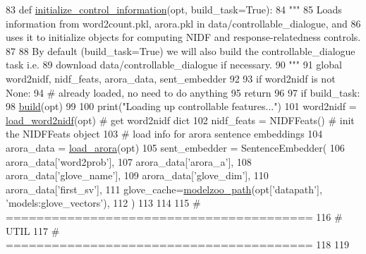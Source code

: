 \begin{DoxyCode}
83 \textcolor{keyword}{def }\hyperlink{namespaceprojects_1_1controllable__dialogue_1_1controllable__seq2seq_1_1controls_aafbe257df1791349439cc63c99de8b5e}{initialize\_control\_information}(opt, build\_task=True):
84     \textcolor{stringliteral}{"""}
85 \textcolor{stringliteral}{    Loads information from word2count.pkl, arora.pkl in data/controllable\_dialogue, and}
86 \textcolor{stringliteral}{    uses it to initialize objects for computing NIDF and response-relatedness controls.}
87 \textcolor{stringliteral}{}
88 \textcolor{stringliteral}{    By default (build\_task=True) we will also build the controllable\_dialogue task i.e.}
89 \textcolor{stringliteral}{    download data/controllable\_dialogue if necessary.}
90 \textcolor{stringliteral}{    """}
91     \textcolor{keyword}{global} word2nidf, nidf\_feats, arora\_data, sent\_embedder
92 
93     \textcolor{keywordflow}{if} word2nidf \textcolor{keywordflow}{is} \textcolor{keywordflow}{not} \textcolor{keywordtype}{None}:
94         \textcolor{comment}{# already loaded, no need to do anything}
95         \textcolor{keywordflow}{return}
96 
97     \textcolor{keywordflow}{if} build\_task:
98         \hyperlink{namespaceparlai_1_1mturk_1_1tasks_1_1talkthewalk_1_1download_a8c0fbb9b6dfe127cb8c1bd6e7c4e33fd}{build}(opt)
99 
100     print(\textcolor{stringliteral}{"Loading up controllable features..."})
101     word2nidf = \hyperlink{namespaceprojects_1_1controllable__dialogue_1_1controllable__seq2seq_1_1nidf_a2f882ed55572a6f2f7558732a6a692ee}{load\_word2nidf}(opt)  \textcolor{comment}{# get word2nidf dict}
102     nidf\_feats = NIDFFeats()  \textcolor{comment}{# init the NIDFFeats object}
103     \textcolor{comment}{# load info for arora sentence embeddings}
104     arora\_data = \hyperlink{namespaceprojects_1_1controllable__dialogue_1_1controllable__seq2seq_1_1arora_aaea3eb10fd28246497bb20a148a26da8}{load\_arora}(opt)
105     sent\_embedder = SentenceEmbedder(
106         arora\_data[\textcolor{stringliteral}{'word2prob'}],
107         arora\_data[\textcolor{stringliteral}{'arora\_a'}],
108         arora\_data[\textcolor{stringliteral}{'glove\_name'}],
109         arora\_data[\textcolor{stringliteral}{'glove\_dim'}],
110         arora\_data[\textcolor{stringliteral}{'first\_sv'}],
111         glove\_cache=\hyperlink{namespaceparlai_1_1agents_1_1legacy__agents_1_1seq2seq_1_1utils__v0_a5fbd3301b67f00d6d146fb01c7cd7626}{modelzoo\_path}(opt[\textcolor{stringliteral}{'datapath'}], \textcolor{stringliteral}{'models:glove\_vectors'}),
112     )
113 
114 
115 \textcolor{comment}{# ========================================}
116 \textcolor{comment}{# UTIL}
117 \textcolor{comment}{# ========================================}
118 
119 
\end{DoxyCode}
